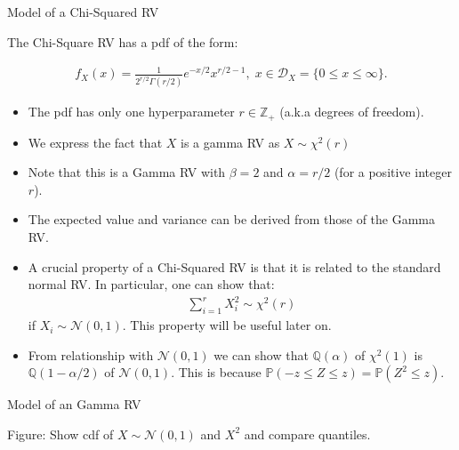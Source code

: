 \documentclass[9pt]{beamer}
\begin{document}
%
\begin{frame}{Model of a Chi-Squared RV}

The Chi-Square RV has a pdf of the form:
\begin{block}{}
\begin{align*}
f_X(x)=\frac{1}{2^{r/2}\Gamma(r/2)}e^{-x/2}x^{r/2-1},\; x\in \mathcal{D}_X=\{0\leq x\leq \infty\}.
\end{align*}
\end{block}
\begin{itemize}
\item The pdf has only one hyperparameter $r\in \mathbb{Z}_+$ (a.k.a degrees of freedom).
\item We express the fact that $X$ is a gamma RV as $X\sim \chi^2(r)$
\item Note that this is a Gamma RV with $\beta=2$ and $\alpha=r/2$ (for a positive integer $r$). 
\item The expected value and variance can be derived from those of the Gamma RV.  
\item A crucial property of a Chi-Squared RV is that it is related to the standard normal RV. In particular, one can show that: 
\begin{align*}
\sum_{i=1}^rX_i^2\sim \chi^2(r)
\end{align*}
if $X_i\sim \mathcal{N}(0,1)$. This property will be useful later on. 
\item From relationship with $\mathcal{N}(0,1)$ we can show that $\mathbb{Q}(\alpha)$ of $\chi^2(1)$ is $\mathbb{Q}(1-\alpha/2)$ of $\mathcal{N}(0,1)$. This is because $\mathbb{P}(-z\leq Z\leq z)=\mathbb{P}(Z^2\leq z)$.  
\end{itemize}

\end{frame}

%
\begin{frame}{Model of an Gamma RV}
\begin{block}{}
{\color{red} Figure: Show cdf of $X\sim \mathcal{N}(0,1)$ and $X^2$ and compare quantiles.}
\end{block}

\end{frame}
\end{document}
